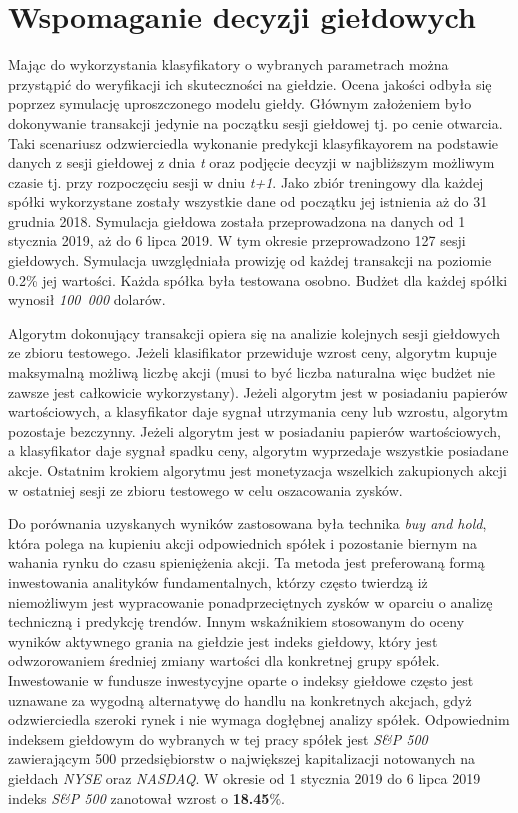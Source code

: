 \documentclass[a4paper, twoside, 11pt, openright]{article}
\begin{document}
\newpage

\section{Wspomaganie decyzji giełdowych}

Mając do wykorzystania klasyfikatory o wybranych parametrach można przystąpić do weryfikacji ich skuteczności na giełdzie. Ocena jakości odbyła się poprzez symulację uproszczonego modelu giełdy. Głównym założeniem było dokonywanie transakcji jedynie na początku sesji giełdowej tj. po cenie otwarcia. Taki scenariusz odzwierciedla wykonanie predykcji klasyfikayorem na podstawie danych z sesji giełdowej z dnia \textit{t} oraz podjęcie decyzji w najbliższym możliwym czasie tj. przy rozpoczęciu sesji w dniu \textit{t+1}. Jako zbiór treningowy dla każdej spółki wykorzystane zostały wszystkie dane od początku jej istnienia aż do 31 grudnia 2018. Symulacja giełdowa została przeprowadzona na danych od 1 stycznia 2019, aż do 6 lipca 2019. W tym okresie przeprowadzono 127 sesji giełdowych. Symulacja uwzględniała prowizję od każdej transakcji na poziomie 0.2\% jej wartości. Każda spółka była testowana osobno. Budżet dla każdej spółki wynosił \textit{100~000} dolarów.

\bigskip

Algorytm dokonujący transakcji opiera się na analizie kolejnych sesji giełdowych ze zbioru testowego. Jeżeli klasifikator przewiduje wzrost ceny, algorytm kupuje maksymalną możliwą liczbę akcji (musi to być liczba naturalna więc budżet nie zawsze jest całkowicie wykorzystany). Jeżeli algorytm jest w posiadaniu papierów wartościowych, a klasyfikator daje sygnał utrzymania ceny lub wzrostu, algorytm pozostaje bezczynny. Jeżeli algorytm jest w posiadaniu papierów wartościowych, a klasyfikator daje sygnał spadku ceny, algorytm wyprzedaje wszystkie posiadane akcje. Ostatnim krokiem algorytmu jest monetyzacja wszelkich zakupionych akcji w ostatniej sesji ze zbioru testowego w celu oszacowania zysków.

\bigskip

Do porównania uzyskanych wyników zastosowana była technika \textit{buy and hold}, która polega na kupieniu akcji odpowiednich spółek i pozostanie biernym na wahania rynku do czasu spieniężenia akcji.  Ta metoda jest preferowaną formą inwestowania analityków fundamentalnych, którzy często twierdzą iż niemożliwym jest wypracowanie ponadprzeciętnych zysków w oparciu o analizę techniczną i predykcję trendów. Innym wskaźnikiem stosowanym do oceny wyników aktywnego grania na giełdzie jest indeks giełdowy, który jest odwzorowaniem średniej zmiany wartości dla konkretnej grupy spółek. Inwestowanie w fundusze inwestycyjne oparte o indeksy giełdowe często jest uznawane za wygodną alternatywę do handlu na konkretnych akcjach, gdyż odzwierciedla szeroki rynek i nie wymaga dogłębnej analizy spółek.  Odpowiednim indeksem giełdowym do wybranych w tej pracy spółek jest \textit{S\&P 500} zawierającym 500 przedsiębiorstw o największej kapitalizacji notowanych na giełdach \textit{NYSE} oraz \textit{NASDAQ}. W okresie od 1 stycznia 2019 do 6 lipca 2019 indeks \textit{S\&P 500} zanotował wzrost o \textbf{18.45}\%.
\end{document}

